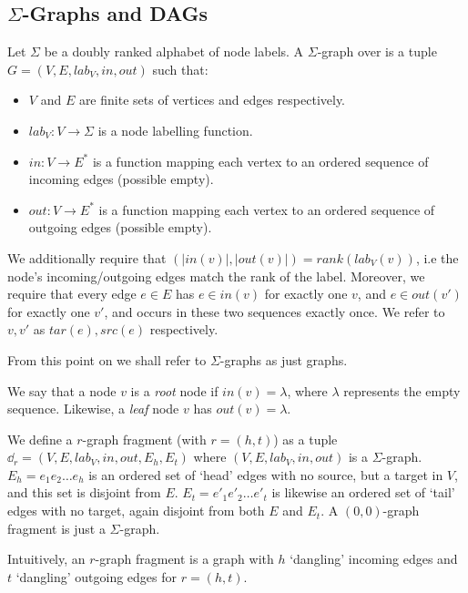 \documentclass[11pt]{article}
\begin{document}
\subsection{$\Sigma$-Graphs and DAGs}
\begin{definition}\label{def:automatagraph} Let $\Sigma$ be a
  doubly ranked alphabet of node labels. A $\Sigma$-graph over is a tuple $G =
  (V, E, lab_V, in, out)$ such that:
  \begin{itemize}
    \item $V$ and $E$ are finite sets of vertices and edges respectively.
    \item $lab_V: V \rightarrow \Sigma$ is a node labelling function.
    \item $in: V \rightarrow E^*$ is a function mapping each vertex to an
    ordered sequence of incoming edges (possible empty).
    \item $out: V \rightarrow E^*$ is a function mapping each vertex to an
    ordered sequence of outgoing edges (possible empty).
  \end{itemize}

  We additionally require that $(|in(v)|,|out(v)|) = rank(lab_V(v))$, i.e the
  node's incoming/outgoing edges match the rank of the label. Moreover, we
  require that every edge $e \in E$ has $e \in in(v)$ for exactly one $v$, and
  $e \in out(v')$ for exactly one $v'$, and occurs in these two sequences
  exactly once. We refer to $v,v'$ as $tar(e),src(e)$ respectively. 
\end{definition}
From this point on we shall refer to $\Sigma$-graphs as just graphs. 

We say that a node $v$ is a \textit{root} node if $in(v) = \lambda$, where
$\lambda$ represents the empty sequence. Likewise, a \textit{leaf} node $v$ has
$out(v) = \lambda$.

\begin{definition}\label{def:graphfragment} We define a
  $r$-graph fragment (with $r=(h,t)$) as a tuple $\dd_r =
  (V,E,lab_V,in,out,E_h,E_t)$ where $(V,E,lab_V,in,out)$ is a $\Sigma$-graph.
  $E_h = e_1e_2\ldots e_h$ is an ordered set of `head' edges with no source, but
  a target in $V$, and this set is disjoint from $E$. $E_t = e'_1e'_2\ldots
  e'_t$ is likewise an ordered set of `tail' edges with no target, again
  disjoint from both $E$ and $E_t$. A $(0,0)$-graph fragment is just a
  $\Sigma$-graph.
\end{definition}

Intuitively, an $r$-graph fragment is a graph with $h$ `dangling' incoming edges
and $t$ `dangling' outgoing edges for $r = (h,t)$. 
\end{document}
